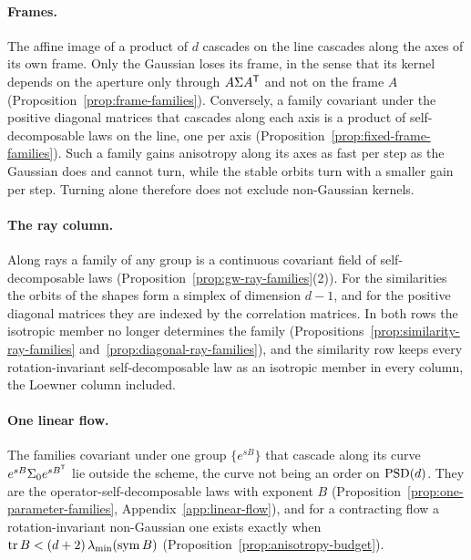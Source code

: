 \paragraph{Frames.} The affine image of a product of $d$ cascades on the line cascades along the axes
of its own frame. Only the Gaussian loses its frame, in the sense that its kernel depends on the
aperture only through $A\Sigma A^{\mathsf{T}}$ and not on the frame $A$ (Proposition~\ref{prop:frame-families}).
Conversely, a family covariant under the positive diagonal matrices that cascades along each axis is
a product of self-decomposable laws on the line, one per axis (Proposition~\ref{prop:fixed-frame-families}).
Such a family gains anisotropy along its axes as fast per step as the Gaussian does and cannot turn,
while the stable orbits turn with a smaller gain per step. Turning alone therefore does not exclude non-Gaussian kernels.

\paragraph{The ray column.} Along rays a family of any group is a continuous covariant field of
self-decomposable laws (Proposition~\ref{prop:gw-ray-families}(2)). For the similarities the orbits of
the shapes form a simplex of dimension $d-1$, and for the positive diagonal matrices they are indexed
by the correlation matrices. In both rows the isotropic member no longer determines the family
(Propositions~\ref{prop:similarity-ray-families} and~\ref{prop:diagonal-ray-families}), and the
similarity row keeps every rotation-invariant self-decomposable law as an isotropic member in every
column, the Loewner column included.

\paragraph{One linear flow.} The families covariant under one group $\{e^{sB}\}$ that cascade along
its curve $e^{sB}\Sigma_0e^{sB^{\mathsf{T}}}$ lie outside the scheme, the curve not being an order on
$\mathrm{PSD}(d)$. They are the operator-self-decomposable laws with exponent $B$
(Proposition~\ref{prop:one-parameter-families}, Appendix~\ref{app:linear-flow}), and for a contracting
flow a rotation-invariant non-Gaussian one exists exactly when $\operatorname{tr} B < (d+2)\,\lambda_{\min}(\mathrm{sym}\,B)$
(Proposition~\ref{prop:anisotropy-budget}).

